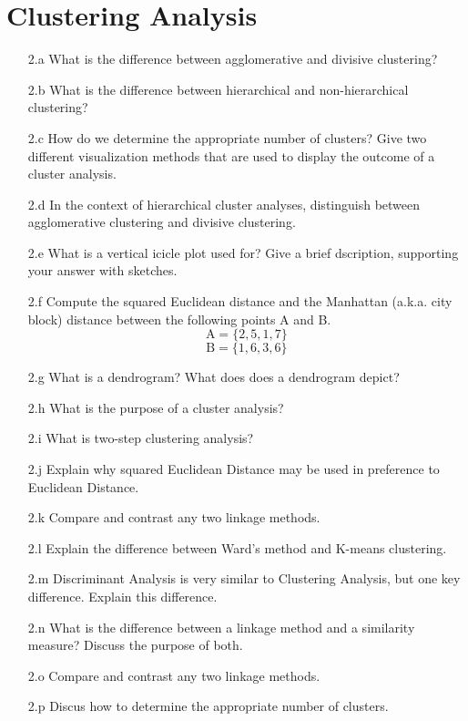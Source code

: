 \documentclass[a4paper,12pt]{article}
\begin{document}
\section*{Clustering Analysis}
\begin{itemize}
\item[2.a] What is the difference between agglomerative and divisive clustering?
\item[2.b] What is the difference between hierarchical and non-hierarchical clustering?
\item[2.c] How do we determine the appropriate number of clusters?  Give two different visualization methods that are used to display the outcome of a cluster analysis.

\item[2.d]In the context of hierarchical cluster analyses, distinguish between agglomerative clustering and divisive clustering.
\item[2.e] What is a vertical icicle plot used for? Give a brief dscription, supporting your answer
with sketches.
\item[2.f] Compute the squared Euclidean distance and the Manhattan (a.k.a. city block) distance between the following points A and B.
\[ \mbox{A} =\{2,5,1,7\}  \]
\[ \mbox{B} =\{1,6,3,6\}  \]
\item[2.g] What is a dendrogram? What does does a dendrogram depict?%
\item[2.h] What is the purpose of a cluster analysis? %

\item[2.i] What is two-step clustering analysis?
\item[2.j] Explain why squared Euclidean Distance may be used in preference to Euclidean Distance.
\item[2.k] Compare and contrast any two linkage methods. %

\item[2.l] Explain the difference between Ward's method and K-means clustering.%
\item[2.m] Discriminant Analysis is very similar to Clustering Analysis, but one key difference. Explain this difference.%
\item[2.n] What is the difference between a linkage method and a similarity measure? Discuss the purpose of both.%
\item[2.o] Compare and contrast any two linkage methods.
\item[2.p] Discus how to determine the appropriate number of clusters.
\end{itemize}
\end{document}
